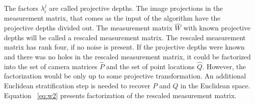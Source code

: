 \documentclass[12pt]{article}
\begin{document}

The factors $\lambda_i^j$ are called projective depths. The image projections in
the measurement matrix, that comes as the input of the algorithm have the projective
depths divided out. The measurement matrix $\hat{W}$ with known projective
depths will be called a rescaled measurement matrix. The rescaled measurement
matrix has rank four, if no noise is present. If the projective depths were
known and there was no holes in the rescaled measurement matrix, it could be
factorized into the set of camera matrices $\hat{P}$ and the set of point locations
$\hat{Q}$.  However, the factorization would be only up to some projective
transformation. An additional  Euclidean stratification step is needed to
recover $P$ and $Q$ in the Euclidean space. Equation ~\ref{eq:w2} presents factorization of the rescaled measurement matrix.
\end{document}
